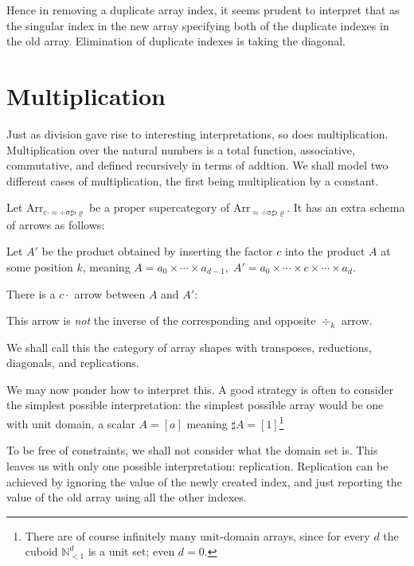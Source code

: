 \documentclass{DIKU-report-variant}
\newcommand\mrm[1]{\mathrm{#1}}
\newcommand\brm[1]{\bm{\mrm{#1}}}
\newcommand\Nat{\mathbb{N}}
\newcommand\Arr[1]{{\brm{Arr}_{\brm{#1}}}}
\newcommand\ADSSFR{\approx\div\sigma\sharp\flat\varrho}
\newcommand\CADSSFR{c\cdot\approx\div\sigma\sharp\flat\varrho}
\begin{document}
Hence in removing a duplicate array index, it seems prudent to interpret that as
the singular index in the new array specifying both of the duplicate indexes in the old array.
Elimination of duplicate indexes is taking the diagonal.

\section{Multiplication}

Just as division gave rise to interesting interpretations, so does multiplication.
Multiplication over the natural numbers is a total function, associative, commutative,
and defined recursively in terms of addtion. We shall model two different cases of 
multiplication, the first being multiplication by a constant.

\begin{definition}
  \label{def:category-of-diagonals}
  Let \(\Arr\CADSSFR\) be a proper supercategory of \(\Arr\ADSSFR\).
  It has an extra schema of arrows as follows:

  Let \(A'\) be the product obtained by inserting the factor \(c\) into
  the product \(A\) at some position \(k\), meaning \(A = a_0 \times \cdots \times a_{d-1},\;
  A' = a_0\times\cdots\times c\times\cdots \times a_d\).

  There is a \(c\!\cdot\) arrow between \(A\) and \(A'\):
  \begin{center}
  \end{center}

  This arrow is \emph{not} the inverse of the corresponding and opposite \(\div_k\) arrow.

  We shall call this the category of array shapes with transposes, reductions,
  diagonals, and replications.
\end{definition}

We may now ponder how to interpret this. A good strategy is often to consider the simplest
possible interpretation: the simplest possible array would be one with unit domain,
a scalar \(A = [a]\) meaning \(\sharp A = [1]\)\footnote{There are of course infinitely
many unit-domain arrays, since for every \(d\) the cuboid \(\Nat_{<1}^d\) is a unit set; even
\(d=0\).}

To be free of constraints, we shall not consider what the domain set is. This leaves us with
only one possible interpretation: replication. Replication can be achieved by ignoring the
value of the newly created index, and just reporting the value of the old array using all
the other indexes.
\end{document}
